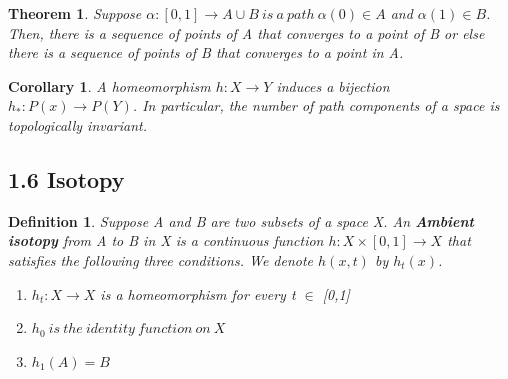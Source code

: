 \documentclass[executivepaper]{article}
\newtheorem{definition}{Definition}
\newtheorem{theorem}{Theorem}
\newtheorem{corollary}{Corollary}[theorem]
\begin{document}
\vspace{2mm}

\begin{tcolorbox}

\begin{theorem}

\textit{Suppose $\alpha : [0,1] \rightarrow A \cup B ~ is ~ a ~ path ~ \alpha(0) \in A$ and $\alpha(1) \in B$. Then, there is a sequence of points of A that converges to a point of B or else there is a sequence of points of B that converges to a point in A.}

\end{theorem}

\end{tcolorbox}

\vspace{2mm}

\begin{tcolorbox}

\begin{corollary}

\textit{A homeomorphism $h: X \rightarrow Y$ induces a bijection $h_{*}: P(x) \rightarrow P(Y)$. In particular, the number of path components of a space is topologically invariant.}

\end{corollary}

\end{tcolorbox}

\subsection*{1.6 Isotopy}

\begin{tcolorbox}

\begin{definition}

\textit{Suppose A and B are two subsets of a space X. An \textbf{Ambient isotopy} from A to B in X is a continuous function $h : X \times [0,1] \rightarrow X$ that satisfies the following three conditions. We denote $h(x,t)$ by $h_{t}(x)$.}

\begin{center}
  
\begin{enumerate}

\item $h_{t}: X \rightarrow X$ is a homeomorphism for every t $\in$ [0,1]

\item $h_{0} ~ is ~ the ~ identity ~ function ~ on ~ X$

\item $h_{1}(A)=B$

\end{enumerate} 

\end{center}

\end{definition}

\end{tcolorbox}
\end{document}
